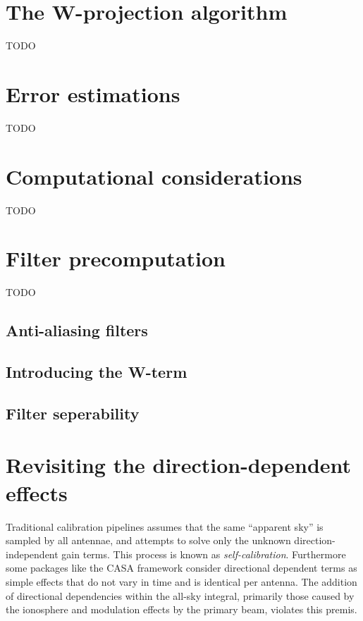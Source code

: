 \section{The W-projection algorithm}
TODO
\section{Error estimations}
TODO
\section{Computational considerations}
TODO
\section{Filter precomputation}
TODO
\subsection{Anti-aliasing filters}
\subsection{Introducing the W-term}
\subsection{Filter seperability}
\section{Revisiting the direction-dependent effects}
Traditional calibration pipelines assumes that the same ``apparent sky'' is sampled by all antennae, and attempts to solve only the unknown direction-independent gain terms.
This process is known as \textit{self-calibration}. Furthermore some packages like the CASA framework consider directional dependent terms as simple effects 
that do not vary in time and is identical per antenna. The addition of directional dependencies within the all-sky integral, primarily those caused by the 
ionosphere and modulation effects by the primary beam, violates this premis. 

